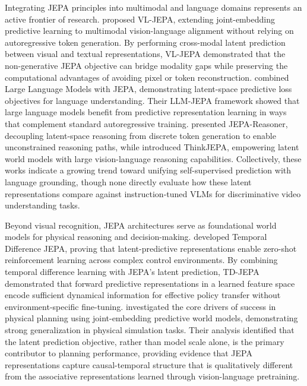 Integrating JEPA principles into multimodal and language domains represents an active frontier of research. \citet{chen2026vljepa} proposed VL-JEPA, extending joint-embedding predictive learning to multimodal vision-language alignment without relying on autoregressive token generation. By performing cross-modal latent prediction between visual and textual representations, VL-JEPA demonstrated that the non-generative JEPA objective can bridge modality gaps while preserving the computational advantages of avoiding pixel or token reconstruction. \citet{huang2025llmjepa} combined Large Language Models with JEPA, demonstrating latent-space predictive loss objectives for language understanding. Their LLM-JEPA framework showed that large language models benefit from predictive representation learning in ways that complement standard autoregressive training. \citet{liu2026jepareasoner} presented JEPA-Reasoner, decoupling latent-space reasoning from discrete token generation to enable unconstrained reasoning paths, while \citet{zhang2026thinkjepa} introduced ThinkJEPA, empowering latent world models with large vision-language reasoning capabilities. Collectively, these works indicate a growing trend toward unifying self-supervised prediction with language grounding, though none directly evaluate how these latent representations compare against instruction-tuned VLMs for discriminative video understanding tasks.


Beyond visual recognition, JEPA architectures serve as foundational world models for physical reasoning and decision-making. \citet{bagatella2025tdjepa} developed Temporal Difference JEPA, proving that latent-predictive representations enable zero-shot reinforcement learning across complex control environments. By combining temporal difference learning with JEPA's latent prediction, TD-JEPA demonstrated that forward predictive representations in a learned feature space encode sufficient dynamical information for effective policy transfer without environment-specific fine-tuning. \citet{terver2026physicaljepa} investigated the core drivers of success in physical planning using joint-embedding predictive world models, demonstrating strong generalization in physical simulation tasks. Their analysis identified that the latent prediction objective, rather than model scale alone, is the primary contributor to planning performance, providing evidence that JEPA representations capture causal-temporal structure that is qualitatively different from the associative representations learned through vision-language pretraining.


